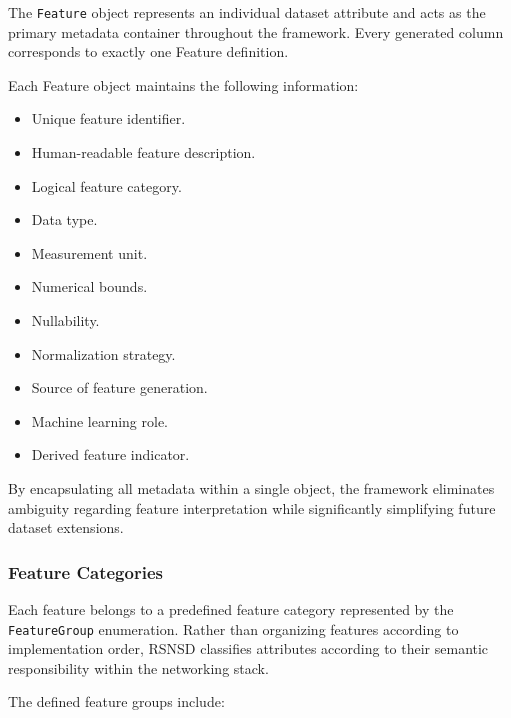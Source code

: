 \documentclass[12pt,a4paper]{article}
\begin{document}
The \texttt{Feature} object represents an individual dataset attribute and acts as the primary metadata container throughout the framework. Every generated column corresponds to exactly one Feature definition.

Each Feature object maintains the following information:

\begin{itemize}
	
	\item Unique feature identifier.
	
	\item Human-readable feature description.
	
	\item Logical feature category.
	
	\item Data type.
	
	\item Measurement unit.
	
	\item Numerical bounds.
	
	\item Nullability.
	
	\item Normalization strategy.
	
	\item Source of feature generation.
	
	\item Machine learning role.
	
	\item Derived feature indicator.
	
\end{itemize}

By encapsulating all metadata within a single object, the framework eliminates ambiguity regarding feature interpretation while significantly simplifying future dataset extensions.

\subsubsection{Feature Categories}

Each feature belongs to a predefined feature category represented by the \texttt{FeatureGroup} enumeration. Rather than organizing features according to implementation order, RSNSD classifies attributes according to their semantic responsibility within the networking stack.

The defined feature groups include:
\end{document}
